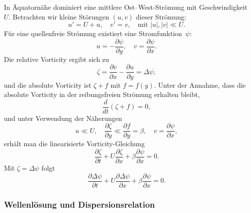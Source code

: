 In Äquatornähe dominiert eine mittlere Ost–West-Strömung mit Geschwindigkeit
\(U\). Betrachten wir kleine Störungen \((u,v)\) dieser Strömung:
\begin{equation}
	u' = U + u, \quad v' = v, \quad \text{mit } |u|, |v| \ll U.
	\label{rossby:eq:perturbation}
\end{equation}
Für eine quellenfreie Strömung existiert eine Stromfunktion~\(\psi\):
\begin{equation}
	u = -\frac{\partial \psi}{\partial y}, \quad v = \frac{\partial \psi}{\partial x}.
	\label{rossby:eq:stream_function}
\end{equation}
Die relative Vorticity ergibt sich zu
\begin{equation}
	\zeta = \frac{\partial v}{\partial x} - \frac{\partial u}{\partial y} = \Delta \psi,
	\label{rossby:eq:relative_vorticity}
\end{equation}
und die absolute Vorticity ist \(\zeta + f\) mit \(f = f(y)\). Unter der Annahme, dass die absolute Vorticity in der reibungsfreien Strömung erhalten bleibt,
\begin{equation}
	\frac{d}{dt} (\zeta + f) = 0,
	\label{rossby:eq:absolute_vorticity_conservation}
\end{equation}
und unter Verwendung der Näherungen
\begin{equation}
	u \ll U, \quad \frac{\partial \zeta}{\partial y} \ll \frac{\partial f}{\partial y} = \beta, \quad v = \frac{\partial \psi}{\partial x},
	\label{rossby:eq:linear_approximations}
\end{equation}
erhält man die linearisierte Vorticity-Gleichung
\begin{equation}
	\frac{\partial \zeta}{\partial t} + U \frac{\partial \zeta}{\partial x} + \beta \frac{\partial \psi}{\partial x} = 0.
	\label{rossby:eq:linear_vorticity_equation}
\end{equation}
Mit \(\zeta = \Delta \psi\) folgt
\begin{equation}
	\frac{\partial \Delta \psi}{\partial t} + U \frac{\partial \Delta \psi}{\partial x} + \beta \frac{\partial \psi}{\partial x} = 0.
	\label{rossby:eq:linear_vorticity_equation_psi}
\end{equation}

\subsubsection{Wellenlösung und Dispersionsrelation}

